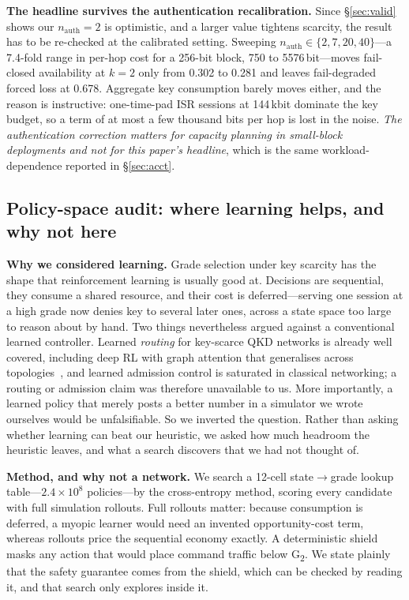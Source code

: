 \documentclass[conference]{IEEEtran}
\newcommand{\GII}{G\textsubscript{2}}
\begin{document}
\textbf{The headline survives the authentication recalibration.} Since
\S\ref{sec:valid} shows our $n_{\mathrm{auth}}=2$ is optimistic, and a larger
value tightens scarcity, the result has to be re-checked at the calibrated
setting. Sweeping $n_{\mathrm{auth}} \in \{2,7,20,40\}$---a 7.4-fold range in
per-hop cost for a 256-bit block, 750 to 5576\,bit---moves fail-closed
availability at $k=2$ only from 0.302 to 0.281 and leaves fail-degraded forced
loss at 0.678. Aggregate key consumption barely moves either, and the reason is
instructive: one-time-pad ISR sessions at 144\,kbit dominate the key budget, so a
term of at most a few thousand bits per hop is lost in the noise. \emph{The
authentication correction matters for capacity planning in small-block
deployments and not for this paper's headline}, which is the same
workload-dependence reported in \S\ref{sec:acct}.

\subsection{Policy-space audit: where learning helps, and why not
here}\label{sec:audit}

\textbf{Why we considered learning.} Grade selection under key scarcity has the
shape that reinforcement learning is usually good at. Decisions are sequential,
they consume a shared resource, and their cost is deferred---serving one session
at a high grade now denies key to several later ones, across a state space too
large to reason about by hand. Two things nevertheless argued against a
conventional learned controller. Learned \emph{routing} for key-scarce QKD
networks is already well covered, including deep RL with graph attention that
generalises across topologies~\cite{hao}, and learned admission control is
saturated in classical networking; a routing or admission claim was therefore
unavailable to us. More importantly, a learned policy that merely posts a better
number in a simulator we wrote ourselves would be unfalsifiable. So we inverted
the question. Rather than asking whether learning can beat our heuristic, we
asked how much headroom the heuristic leaves, and what a search discovers that we
had not thought of.

\textbf{Method, and why not a network.} We search a 12-cell
state$\rightarrow$grade lookup table---$2.4\times10^{8}$ policies---by the
cross-entropy method, scoring every candidate with full simulation rollouts. Full
rollouts matter: because consumption is deferred, a myopic learner would need an
invented opportunity-cost term, whereas rollouts price the sequential economy
exactly. A deterministic shield masks any action that would place command traffic
below \GII. We state plainly that the safety guarantee comes from the shield,
which can be checked by reading it, and that search only explores inside it.
\end{document}

